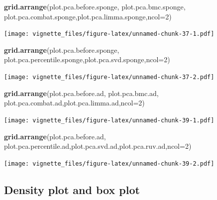 \documentclass[]{book}
\newenvironment{Shaded}{\begin{snugshade}}{\end{snugshade}}
\newcommand{\KeywordTok}[1]{\textcolor[rgb]{0.13,0.29,0.53}{\textbf{#1}}}
\newcommand{\DataTypeTok}[1]{\textcolor[rgb]{0.13,0.29,0.53}{#1}}
\newcommand{\DecValTok}[1]{\textcolor[rgb]{0.00,0.00,0.81}{#1}}
\newcommand{\NormalTok}[1]{#1}
\begin{document}
\begin{Shaded}
\begin{Highlighting}[]
\KeywordTok{grid.arrange}\NormalTok{(plot.pca.before.sponge, plot.pca.bmc.sponge, plot.pca.combat.sponge,plot.pca.limma.sponge,}\DataTypeTok{ncol=}\DecValTok{2}\NormalTok{)}
\end{Highlighting}
\end{Shaded}

\texttt{[image: vignette\_files/figure-latex/unnamed-chunk-37-1.pdf]}

\begin{Shaded}
\begin{Highlighting}[]
\KeywordTok{grid.arrange}\NormalTok{(plot.pca.before.sponge, plot.pca.percentile.sponge,plot.pca.svd.sponge,}\DataTypeTok{ncol=}\DecValTok{2}\NormalTok{)}
\end{Highlighting}
\end{Shaded}

\texttt{[image: vignette\_files/figure-latex/unnamed-chunk-37-2.pdf]}

\begin{Shaded}
\begin{Highlighting}[]
\KeywordTok{grid.arrange}\NormalTok{(plot.pca.before.ad, plot.pca.bmc.ad, plot.pca.combat.ad,plot.pca.limma.ad,}\DataTypeTok{ncol=}\DecValTok{2}\NormalTok{)}
\end{Highlighting}
\end{Shaded}

\texttt{[image: vignette\_files/figure-latex/unnamed-chunk-39-1.pdf]}

\begin{Shaded}
\begin{Highlighting}[]
\KeywordTok{grid.arrange}\NormalTok{(plot.pca.before.ad, plot.pca.percentile.ad,plot.pca.svd.ad,plot.pca.ruv.ad,}\DataTypeTok{ncol=}\DecValTok{2}\NormalTok{)}
\end{Highlighting}
\end{Shaded}

\texttt{[image: vignette\_files/figure-latex/unnamed-chunk-39-2.pdf]}

\subsection{Density plot and box
plot}\label{density-plot-and-box-plot-1}
\end{document}
